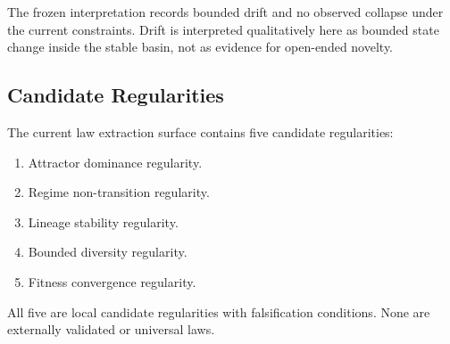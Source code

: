 The frozen interpretation records bounded drift and no observed collapse under
the current constraints. Drift is interpreted qualitatively here as bounded
state change inside the stable basin, not as evidence for open-ended novelty.



\subsection{Candidate Regularities}

The current law extraction surface contains five candidate regularities:
\begin{enumerate}
  \item Attractor dominance regularity.
  \item Regime non-transition regularity.
  \item Lineage stability regularity.
  \item Bounded diversity regularity.
  \item Fitness convergence regularity.
\end{enumerate}
All five are local candidate regularities with falsification conditions. None
are externally validated or universal laws.
